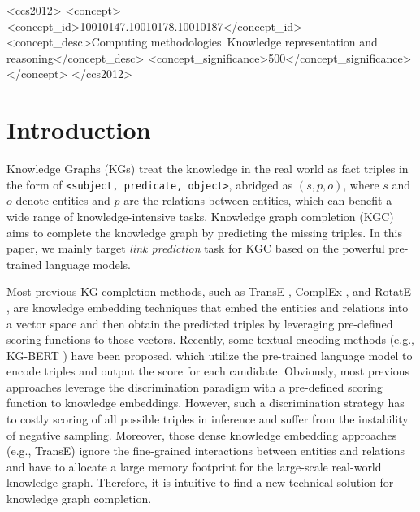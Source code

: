 \documentclass[sigconf]{acmart}
\begin{document}
\begin{CCSXML}
<ccs2012>
   <concept>
       <concept_id>10010147.10010178.10010187</concept_id>
       <concept_desc>Computing methodologies~Knowledge representation and reasoning</concept_desc>
       <concept_significance>500</concept_significance>
       </concept>
 </ccs2012>
\end{CCSXML}






\maketitle

\section{Introduction}

Knowledge Graphs (KGs) treat the knowledge in the real world as fact triples in the form of \texttt{<subject, predicate, object>}, abridged as $(s, p, o)$, where $s$ and $o$ denote entities and $p$ are the relations between entities, which can benefit a wide range of knowledge-intensive tasks.
Knowledge graph completion (KGC) aims to complete the knowledge graph by predicting the missing triples.
In this paper, we mainly target \textit{link prediction} task for KGC based on the powerful pre-trained language models.

Most previous KG completion methods, such as TransE \cite{Bordes:TransE}, ComplEx \cite{complex}, and RotatE \cite{RotatE}, are knowledge embedding techniques that embed the entities and relations into a vector space and then obtain the predicted triples by leveraging pre-defined scoring functions to those vectors.
Recently, some textual encoding methods (e.g., KG-BERT \cite{kgbert}) have been proposed, which utilize the pre-trained language model to encode triples and output the score for each candidate.
Obviously, most previous approaches leverage the discrimination paradigm with a pre-defined scoring function to knowledge embeddings. 
However, such a discrimination strategy has to costly scoring of all possible triples in inference and suffer from the instability of negative sampling. 
Moreover, those dense knowledge embedding approaches (e.g., TransE) ignore the fine-grained interactions between entities and relations and have to allocate a large memory footprint for the large-scale real-world knowledge graph. 
Therefore, it is intuitive to find a new technical solution for knowledge graph completion.
\end{document}
